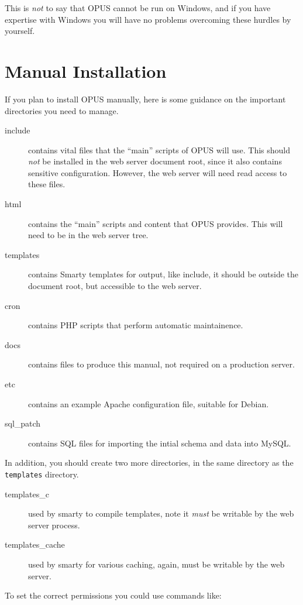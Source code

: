 \documentclass[12 pt]{book}
\begin{document}
This is \emph{not} to say that OPUS cannot be run on Windows, and if you have expertise with Windows you will have no problems overcoming these
hurdles by yourself.

\section{Manual Installation}

If you plan to install OPUS manually, here is some guidance on the important directories you need to manage.

\begin{description}
  \item[include] contains vital files that the ``main'' scripts of OPUS will use. This should \emph{not} be installed in the web server document root, since
  it also contains sensitive configuration. However, the web server will need read access to these files.
  \item[html] contains the ``main'' scripts and content that OPUS provides. This will need to be in the web server tree.
  \item[templates] contains Smarty templates for output, like include, it should be outside the document root, but accessible to the web server.
  \item[cron] contains PHP scripts that perform automatic maintainence. 
  \item[docs] contains files to produce this manual, not required on a production server.
  \item[etc] contains an example Apache configuration file, suitable for Debian.
  \item[sql\_patch] contains SQL files for importing the intial schema and data into MySQL.
\end{description}

In addition, you should create two more directories, in the same directory as the \lstinline!templates! directory.

\begin{description}
  \item[templates\_c] used by smarty to compile templates, note it \emph{must} be writable by the web server process.
  \item[templates\_cache] used by smarty for various caching, again, must be writable by the web server.
\end{description}

To set the correct permissions you could use commands like:
\end{document}
